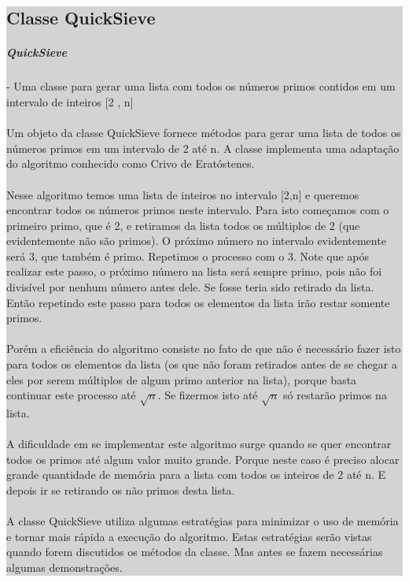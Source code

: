 \documentclass[a4paper,12pt,openany]{book}
\begin{document}
\newpage


\colorbox{lightgrey}{
	
	\begin{minipage}{18cm}
		
		\chapter*{Classe QuickSieve}
		\label{classe:QuickSieve}
		
		\paragraph{QuickSieve} - Uma classe para gerar uma lista com todos os números primos contidos em um intervalo de inteiros [2 , n]
		\\
		\\
		Um objeto da classe QuickSieve fornece métodos para gerar uma lista de todos os números primos em um intervalo de 2 até n. A classe implementa uma adaptação do algoritmo conhecido como Crivo de Eratóstenes.
		\\
		\\
		Nesse algoritmo temos uma lista de inteiros no intervalo [2,n] e queremos encontrar todos os números primos neste intervalo. Para isto começamos com o primeiro primo, que é 2, e retiramos da lista todos os múltiplos de 2 (que evidentemente não são primos). O próximo número no intervalo evidentemente será 3, que também é primo. Repetimos o processo com o 3. Note que após realizar este passo, o próximo número na lista será sempre primo, pois não foi divisível por nenhum número antes dele. Se fosse teria sido retirado da lista. Então repetindo este passo para todos os elementos da lista irão restar somente primos.
		\\
		\\
		Porém a eficiência do algoritmo consiste no fato de que não é necessário fazer isto para todos os elementos da lista (os que não foram retirados antes de se chegar a eles por serem múltiplos de algum primo anterior na lista), porque basta continuar este processo até $ \sqrt{n} $. Se fizermos isto até $ \sqrt{n} $ só restarão primos na lista.
		\\
		\\
		A dificuldade em se implementar este algoritmo surge quando se quer encontrar todos os primos até algum valor muito grande. Porque neste caso é preciso alocar grande quantidade de memória para a lista com todos os inteiros de 2 até n. E depois ir se retirando os não primos desta lista.
		\\
		\\
		A classe QuickSieve utiliza algumas estratégias para minimizar o uso de memória e tornar mais rápida a execução do algoritmo. Estas estratégias serão vistas quando forem discutidos os métodos da classe. Mas antes se fazem necessárias algumas demonstrações.
	

\end{minipage}}
\end{document}
